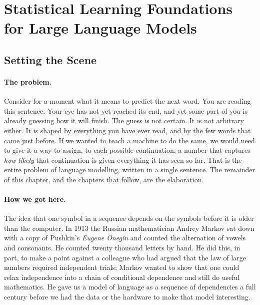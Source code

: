 
\section{Statistical Learning Foundations for Large Language Models}
\label{sec:week1}

\subsection*{Setting the Scene}

\paragraph{The problem.} Consider for a moment what it means to
predict the next word. You are reading this sentence. Your eye has
not yet reached its end, and yet some part of you is already
guessing how it will finish. The guess is not certain. It is not
arbitrary either. It is shaped by everything you have ever read, and
by the few words that came just before. If we wanted to teach a
machine to do the same, we would need to give it a way to assign,
to each possible continuation, a number that captures \emph{how
likely} that continuation is given everything it has seen so far.
That is the entire problem of language modelling, written in a
single sentence. The remainder of this chapter, and the chapters
that follow, are the elaboration.

\paragraph{How we got here.} The idea that one symbol in a sequence
depends on the symbols before it is older than the computer. In
1913 the Russian mathematician Andrey Markov sat down with a copy
of Pushkin's \emph{Eugene Onegin} and counted the alternation of
vowels and consonants. He counted twenty thousand letters by
hand. He did this, in part, to make a point against a colleague
who had argued that the law of large numbers required independent
trials; Markov wanted to show that one could relax independence
into a chain of conditional dependence and still do useful
mathematics. He gave us a model of language as a sequence of
dependencies a full century before we had the data or the hardware
to make that model interesting.

